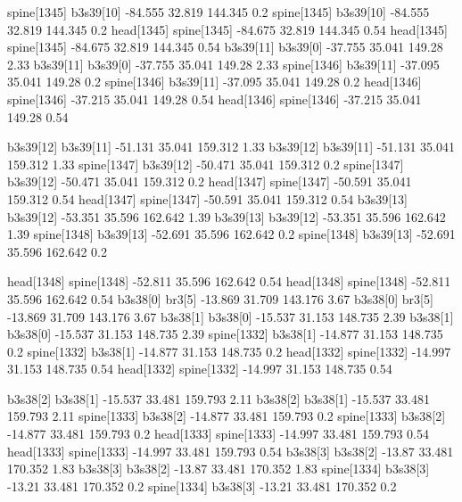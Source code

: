 spine[1345]    b3s39[10]    -84.555    32.819    144.345    0.2
spine[1345]    b3s39[10]    -84.555    32.819    144.345    0.2
head[1345]    spine[1345]    -84.675    32.819    144.345    0.54
head[1345]    spine[1345]    -84.675    32.819    144.345    0.54
b3s39[11]    b3s39[0]    -37.755    35.041    149.28    2.33
b3s39[11]    b3s39[0]    -37.755    35.041    149.28    2.33
spine[1346]    b3s39[11]    -37.095    35.041    149.28    0.2
spine[1346]    b3s39[11]    -37.095    35.041    149.28    0.2
head[1346]    spine[1346]    -37.215    35.041    149.28    0.54
head[1346]    spine[1346]    -37.215    35.041    149.28    0.54


b3s39[12]    b3s39[11]    -51.131    35.041    159.312    1.33
b3s39[12]    b3s39[11]    -51.131    35.041    159.312    1.33
spine[1347]    b3s39[12]    -50.471    35.041    159.312    0.2
spine[1347]    b3s39[12]    -50.471    35.041    159.312    0.2
head[1347]    spine[1347]    -50.591    35.041    159.312    0.54
head[1347]    spine[1347]    -50.591    35.041    159.312    0.54
b3s39[13]    b3s39[12]    -53.351    35.596    162.642    1.39
b3s39[13]    b3s39[12]    -53.351    35.596    162.642    1.39
spine[1348]    b3s39[13]    -52.691    35.596    162.642    0.2
spine[1348]    b3s39[13]    -52.691    35.596    162.642    0.2


head[1348]    spine[1348]    -52.811    35.596    162.642    0.54
head[1348]    spine[1348]    -52.811    35.596    162.642    0.54
b3s38[0]    br3[5]    -13.869    31.709    143.176    3.67
b3s38[0]    br3[5]    -13.869    31.709    143.176    3.67
b3s38[1]    b3s38[0]    -15.537    31.153    148.735    2.39
b3s38[1]    b3s38[0]    -15.537    31.153    148.735    2.39
spine[1332]    b3s38[1]    -14.877    31.153    148.735    0.2
spine[1332]    b3s38[1]    -14.877    31.153    148.735    0.2
head[1332]    spine[1332]    -14.997    31.153    148.735    0.54
head[1332]    spine[1332]    -14.997    31.153    148.735    0.54


b3s38[2]    b3s38[1]    -15.537    33.481    159.793    2.11
b3s38[2]    b3s38[1]    -15.537    33.481    159.793    2.11
spine[1333]    b3s38[2]    -14.877    33.481    159.793    0.2
spine[1333]    b3s38[2]    -14.877    33.481    159.793    0.2
head[1333]    spine[1333]    -14.997    33.481    159.793    0.54
head[1333]    spine[1333]    -14.997    33.481    159.793    0.54
b3s38[3]    b3s38[2]    -13.87    33.481    170.352    1.83
b3s38[3]    b3s38[2]    -13.87    33.481    170.352    1.83
spine[1334]    b3s38[3]    -13.21    33.481    170.352    0.2
spine[1334]    b3s38[3]    -13.21    33.481    170.352    0.2


